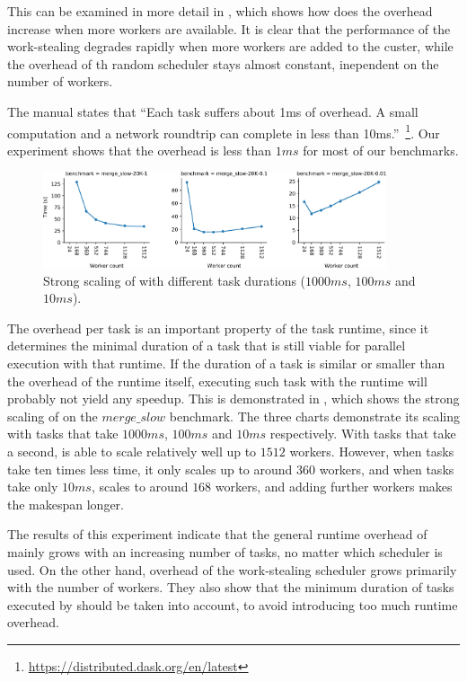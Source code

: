This can be examined in more detail in , which shows how does the
overhead increase when more workers are available. It is clear that the performance of the
work-stealing degrades rapidly when more workers are added to the custer, while the overhead of th
random scheduler stays almost constant, inependent on the number of workers.

The \dask{} manual states that ``Each task suffers about 1ms of overhead. A
small computation and a network roundtrip can complete in less than
10ms.''~\footnote{\url{https://distributed.dask.org/en/latest}}. Our experiment shows that the overhead is less than
$1ms$ for most of our benchmarks.

\begin{figure}
	\centering
	\includegraphics[width=0.9\textwidth]{imgs/rsds/charts/dask-strong-scaling}
	\caption{Strong scaling of \dask{} with different task durations
	($1000ms$, $100ms$ and
	$10ms$).}
	\label{fig:dask-strong-scaling}
\end{figure}

The overhead per task is an important property of the task runtime, since it determines the minimal
duration of a task that is still viable for parallel execution with that runtime. If the duration
of a task is similar or smaller than the overhead of the runtime itself, executing such task with
the runtime will probably not yield any speedup. This is demonstrated in
, which shows the strong scaling of \dask{} on the
$merge\_slow$ benchmark. The three charts demonstrate its scaling with tasks that take
$1000ms$, $100ms$ and $10ms$ respectively.
With tasks that take a second, \dask{} is able to scale relatively well up to
$1512$ workers. However, when tasks take ten times less time, it only scales up
to around $360$ workers, and when tasks take only $10ms$,
\dask{} scales to around $168$ workers, and adding further
workers makes the makespan longer.

The results of this experiment indicate that the general runtime overhead of
\dask{} mainly grows with an increasing number of tasks, no matter which
scheduler is used. On the other hand, overhead of the work-stealing scheduler grows primarily with
the number of workers. They also show that the minimum duration of tasks executed by
\dask{} should be taken into account, to avoid introducing too much runtime
overhead.


